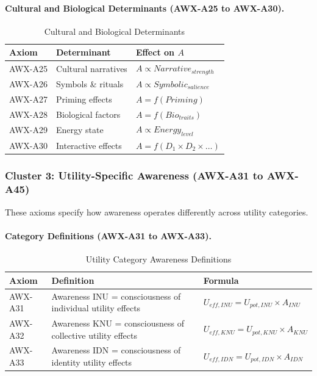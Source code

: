 \paragraph{Cultural and Biological Determinants (AWX-A25 to AWX-A30).}

\begin{table}[htbp]
\centering
\caption{Cultural and Biological Determinants}
\label{tab:cultural-biological-determinants}
\renewcommand{\arraystretch}{1.3}
\begin{tabular}{@{}lll@{}}
\toprule
\textbf{Axiom} & \textbf{Determinant} & \textbf{Effect on $A$} \\
\midrule
AWX-A25 & Cultural narratives & $A \propto Narrative_{strength}$ \\
AWX-A26 & Symbols \& rituals & $A \propto Symbolic_{salience}$ \\
AWX-A27 & Priming effects & $A = f(Priming)$ \\
AWX-A28 & Biological factors & $A = f(Bio_{traits})$ \\
AWX-A29 & Energy state & $A \propto Energy_{level}$ \\
AWX-A30 & Interactive effects & $A = f(D_1 \times D_2 \times \ldots)$ \\
\bottomrule
\end{tabular}
\end{table}

\subsubsection{Cluster 3: Utility-Specific Awareness (AWX-A31 to AWX-A45)}

These axioms specify how awareness operates differently across utility categories.

\paragraph{Category Definitions (AWX-A31 to AWX-A33).}

\begin{table}[htbp]
\centering
\caption{Utility Category Awareness Definitions}
\label{tab:category-definitions}
\renewcommand{\arraystretch}{1.3}
\begin{tabular}{@{}lp{8cm}l@{}}
\toprule
\textbf{Axiom} & \textbf{Definition} & \textbf{Formula} \\
\midrule
AWX-A31 & Awareness INU = consciousness of individual utility effects & $U_{eff,INU} = U_{pot,INU} \times A_{INU}$ \\
AWX-A32 & Awareness KNU = consciousness of collective utility effects & $U_{eff,KNU} = U_{pot,KNU} \times A_{KNU}$ \\
AWX-A33 & Awareness IDN = consciousness of identity utility effects & $U_{eff,IDN} = U_{pot,IDN} \times A_{IDN}$ \\
\bottomrule
\end{tabular}
\end{table}

